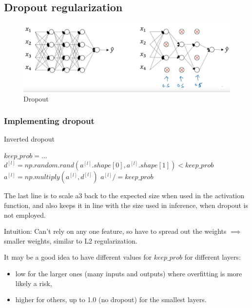 \newpage

\subsection*{Dropout regularization}

\begin{figure}[htbp]
    \begin{minipage}[t]{\textwidth}
        \includegraphics[width=\linewidth, valign=t]{images/dropout.png}
        \caption*{Dropout}
    \end{minipage}
\end{figure}

\subsubsection*{Implementing dropout}

\begin{algorithm}[H]
    \caption*{Inverted dropout}
    \begin{algorithmic}[1]
        \State $keep\_prob = \ldots$
        \State $d^{[l]} = np.random.rand(a^{[l]}.shape[0], a^{[l]}.shape[1]) < keep\_prob$
        \State $a^{[l]} = np.multiply(a^{[l]}, d^{[l]})$
        \State $a^{[l]} /= keep\_prob$
    \end{algorithmic}
\end{algorithm}

The last line is to scale a3 back to the expected size when used in the activation function, 
and also keeps it in line with the size used in inference, when dropout is not employed.

Intuition: Can't rely on any one feature, so have to spread out the weights $\implies$ smaller weights, 
similar to L2 regularization.

It may be a good idea to have different values for $keep\_prob$ for different layers:
\begin{itemize}
    \item low for the larger ones (many inputs and outputs) where overfitting is more likely a risk, 
    \item higher for others, up to 1.0 (no dropout) for the smallest layers. 
\end{itemize}


